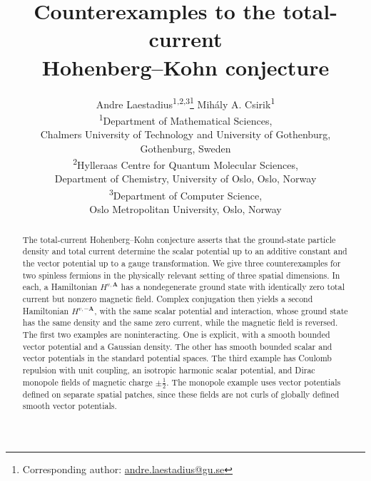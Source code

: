 \documentclass[11pt,a4paper]{article}
\theoremstyle{remark}
\theoremstyle{plain}
\newcommand{\A}{\mathbf A}
\begin{document}
\title{Counterexamples to the total-current\texorpdfstring{\\}{ }
Hohenberg--Kohn conjecture}
\author{%
  Andre Laestadius\textsuperscript{1,2,3}\thanks{Corresponding author:
  \href{mailto:andre.laestadius@gu.se}{andre.laestadius@gu.se}}\quad
  Mih\'aly A. Csirik\textsuperscript{1}\\[0.7em]
  \small\textsuperscript{1}Department of Mathematical Sciences,\\
  \small Chalmers University of Technology and University of Gothenburg,\\
  \small Gothenburg, Sweden\\[0.4em]
   \small\textsuperscript{2}Hylleraas Centre for Quantum Molecular Sciences,\\
  \small Department of Chemistry, University of Oslo, Oslo, Norway\\[0.4em]
  \small\textsuperscript{3}Department of Computer Science,\\
  \small Oslo Metropolitan University, Oslo, Norway
}
\date{}

\maketitle

\begin{abstract}
The total-current Hohenberg--Kohn conjecture asserts that the
ground-state particle density and total current determine the scalar
potential up to an additive constant and the vector potential up to 
a gauge transformation. We give three
counterexamples for two spinless fermions 
in the physically relevant setting of three 
spatial dimensions. In each, a Hamiltonian
$H^{v,\A}$ has a nondegenerate ground state with identically zero total
current but nonzero magnetic field. Complex conjugation then yields a
second Hamiltonian $H^{v,-\A}$, with the same scalar potential and
interaction, whose ground state has the same density and the same zero
current, while the magnetic field is reversed. The first two examples
are noninteracting. One is explicit, with a smooth bounded vector
potential and a Gaussian density. The other has smooth bounded scalar
and vector potentials in the standard potential spaces. 
The third example has 
Coulomb repulsion with unit coupling, 
an isotropic harmonic scalar potential, and Dirac monopole
fields of magnetic charge $\pm\tfrac12$. The monopole example uses
vector potentials defined on separate spatial patches, 
since these fields are not curls of globally defined smooth vector potentials.
\end{abstract}
\end{document}
